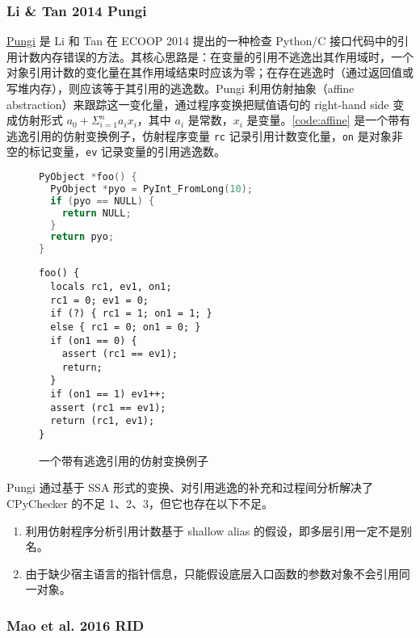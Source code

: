 \subsubsection{Li \& Tan 2014 Pungi}

\href{https://link.springer.com/chapter/10.1007/978-3-662-44202-9_4}{Pungi} 是 Li 和 Tan 在 ECOOP 2014 提出的一种检查 Python/C 接口代码中的引用计数内存错误的方法。其核心思路是：在变量的引用不逃逸出其作用域时，一个对象引用计数的变化量在其作用域结束时应该为零；在存在逃逸时（通过返回值或写堆内存），则应该等于其引用的逃逸数。Pungi 利用仿射抽象（affine abstraction）来跟踪这一变化量，通过程序变换把赋值语句的 right-hand side 变成仿射形式 $a_0 + \Sigma_{i=1}^na_ix_i$，其中 $a_i$ 是常数，$x_i$ 是变量。\autoref{code:affine} 是一个带有逃逸引用的仿射变换例子，仿射程序变量 \texttt{rc} 记录引用计数变化量，\texttt{on} 是对象非空的标记变量，\texttt{ev} 记录变量的引用逃逸数。

\begin{figure}[H]
\begin{minipage}[t]{0.525\linewidth}
\begin{lstlisting}[language={C}]
PyObject *foo() {
  PyObject *pyo = PyInt_FromLong(10);
  if (pyo == NULL) {
    return NULL;
  }
  return pyo;
}
\end{lstlisting}
\end{minipage}
\begin{minipage}[t]{0.445\linewidth}
\begin{lstlisting}
foo() {
  locals rc1, ev1, on1;
  rc1 = 0; ev1 = 0;
  if (?) { rc1 = 1; on1 = 1; }
  else { rc1 = 0; on1 = 0; }
  if (on1 == 0) {
    assert (rc1 == ev1);
    return;
  }
  if (on1 == 1) ev1++;
  assert (rc1 == ev1);
  return (rc1, ev1);
}
\end{lstlisting}
\end{minipage}
\caption{一个带有逃逸引用的仿射变换例子}
\label{code:affine}
\end{figure}

Pungi 通过基于 SSA 形式的变换、对引用逃逸的补充和过程间分析解决了 CPyChecker 的不足 1、2、3，但它也存在以下不足。

\begin{enumerate}
\item 利用仿射程序分析引用计数基于 shallow alias 的假设，即多层引用一定不是别名。
\item 由于缺少宿主语言的指针信息，只能假设底层入口函数的参数对象不会引用同一对象。
\end{enumerate}

\subsubsection{Mao et al. 2016 RID}


